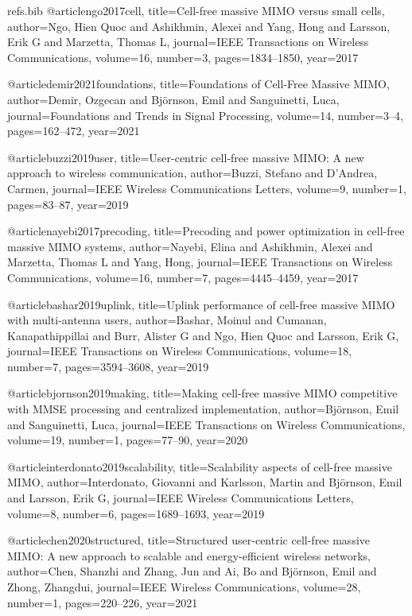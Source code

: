 \begin{filecontents*}{refs.bib}
@article{ngo2017cell,
  title={Cell-free massive MIMO versus small cells},
  author={Ngo, Hien Quoc and Ashikhmin, Alexei and Yang, Hong and Larsson, Erik G and Marzetta, Thomas L},
  journal={IEEE Transactions on Wireless Communications},
  volume={16},
  number={3},
  pages={1834--1850},
  year={2017}
}

@article{demir2021foundations,
  title={Foundations of Cell-Free Massive MIMO},
  author={Demir, Ozgecan and Bj\"ornson, Emil and Sanguinetti, Luca},
  journal={Foundations and Trends in Signal Processing},
  volume={14},
  number={3--4},
  pages={162--472},
  year={2021}
}

@article{buzzi2019user,
  title={User-centric cell-free massive MIMO: A new approach to wireless communication},
  author={Buzzi, Stefano and D'Andrea, Carmen},
  journal={IEEE Wireless Communications Letters},
  volume={9},
  number={1},
  pages={83--87},
  year={2019}
}

@article{nayebi2017precoding,
  title={Precoding and power optimization in cell-free massive MIMO systems},
  author={Nayebi, Elina and Ashikhmin, Alexei and Marzetta, Thomas L and Yang, Hong},
  journal={IEEE Transactions on Wireless Communications},
  volume={16},
  number={7},
  pages={4445--4459},
  year={2017}
}

@article{bashar2019uplink,
  title={Uplink performance of cell-free massive MIMO with multi-antenna users},
  author={Bashar, Moinul and Cumanan, Kanapathippillai and Burr, Alister G and Ngo, Hien Quoc and Larsson, Erik G},
  journal={IEEE Transactions on Wireless Communications},
  volume={18},
  number={7},
  pages={3594--3608},
  year={2019}
}

@article{bjornson2019making,
  title={Making cell-free massive MIMO competitive with MMSE processing and centralized implementation},
  author={Bj\"ornson, Emil and Sanguinetti, Luca},
  journal={IEEE Transactions on Wireless Communications},
  volume={19},
  number={1},
  pages={77--90},
  year={2020}
}

@article{interdonato2019scalability,
  title={Scalability aspects of cell-free massive MIMO},
  author={Interdonato, Giovanni and Karlsson, Martin and Bj{\"o}rnson, Emil and Larsson, Erik G},
  journal={IEEE Wireless Communications Letters},
  volume={8},
  number={6},
  pages={1689--1693},
  year={2019}
}

@article{chen2020structured,
  title={Structured user-centric cell-free massive MIMO: A new approach to scalable and energy-efficient wireless networks},
  author={Chen, Shanzhi and Zhang, Jun and Ai, Bo and Bj{\"o}rnson, Emil and Zhong, Zhangdui},
  journal={IEEE Wireless Communications},
  volume={28},
  number={1},
  pages={220--226},
  year={2021}
}


\end{filecontents*}
